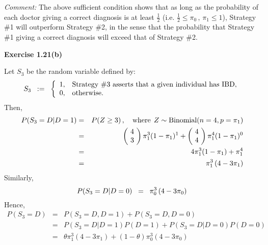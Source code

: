 \vskip 0.5cm
\noindent
\textit{Comment:}\quad
The above sufficient condition shows that as long as the probability of each doctor giving a
correct diagnosis is at least $\frac{1}{2}$ (i.e. $\frac{1}{2} \leq \pi_{0}\,,\,\pi_{1} \leq 1$),
Strategy \#1 will outperform Strategy \#2, in the sense that the probability that Strategy \#1
giving a correct diagnosis will exceed that of Strategy \#2.



\vskip 1.0cm
\noindent
\textbf{Exercise 1.21(b)}

\vskip 0.5cm
\noindent
Let $S_{3}$ be the random variable defined by:
\begin{equation*}
S_{3} \;\; := \;\;
\left\{\begin{array}{cl}
1, & \textnormal{Strategy \#3 asserts that a given individual has IBD}, \\
0, & \textnormal{otherwise}.
\end{array}\right.
\end{equation*}
Then,
\begin{eqnarray*}
P(S_{3} = D \vert D = 1)
& = & P(Z \geq 3)\,,\quad\textnormal{where}\;\,Z \sim \textnormal{Binomial}(n = 4, p = \pi_{1}) \\
& = &   \left(\!\begin{array}{c} 4 \\ 3 \end{array}\!\right) \pi_{1}^{3} (1 - \pi_{1})^{1}
      + \left(\!\begin{array}{c} 4 \\ 4 \end{array}\!\right) \pi_{1}^{4} (1 - \pi_{1})^{0} \\
& = &   4 \pi_{1}^{3} (1 - \pi_{1}) + \pi_{1}^{4} \\
& = &   \pi_{1}^{3}\left(4 - 3\pi_{1}\right) \\
\end{eqnarray*}
Similarly,
\begin{equation*}
P(S_{3} = D \vert D = 0) \;\; = \;\;   \pi_{0}^{3}\left(4 - 3\pi_{0}\right) \\
\end{equation*}
Hence,
\begin{eqnarray*}
P(S_{3} = D)
& = & P(S_{3} = D, D = 1) + P(S_{3} = D, D = 0) \\
& = & P(S_{3} = D \vert D = 1)P(D = 1) + P(S_{3} = D \vert D = 0)P(D = 0) \\
& = & \theta\pi_{1}^{3}\left(4 - 3\pi_{1}\right) + (1 - \theta)\pi_{0}^{3}\left(4 - 3\pi_{0}\right)
\end{eqnarray*}
